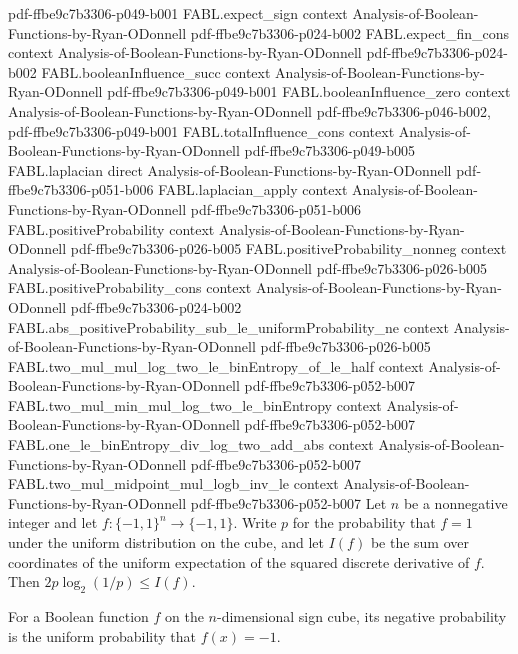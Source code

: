 \begin{theorem}
  {pdf-ffbe9c7b3306-p049-b001}
\proofstep
  {FABL.expect_sign}
  {context}
  {Analysis-of-Boolean-Functions-by-Ryan-ODonnell}
  {pdf-ffbe9c7b3306-p024-b002}
\proofstep
  {FABL.expect_fin_cons}
  {context}
  {Analysis-of-Boolean-Functions-by-Ryan-ODonnell}
  {pdf-ffbe9c7b3306-p024-b002}
\proofstep
  {FABL.booleanInfluence_succ}
  {context}
  {Analysis-of-Boolean-Functions-by-Ryan-ODonnell}
  {pdf-ffbe9c7b3306-p049-b001}
\proofstep
  {FABL.booleanInfluence_zero}
  {context}
  {Analysis-of-Boolean-Functions-by-Ryan-ODonnell}
  {pdf-ffbe9c7b3306-p046-b002,
    pdf-ffbe9c7b3306-p049-b001}
\proofstep
  {FABL.totalInfluence_cons}
  {context}
  {Analysis-of-Boolean-Functions-by-Ryan-ODonnell}
  {pdf-ffbe9c7b3306-p049-b005}
\proofstep
  {FABL.laplacian}
  {direct}
  {Analysis-of-Boolean-Functions-by-Ryan-ODonnell}
  {pdf-ffbe9c7b3306-p051-b006}
\proofstep
  {FABL.laplacian_apply}
  {context}
  {Analysis-of-Boolean-Functions-by-Ryan-ODonnell}
  {pdf-ffbe9c7b3306-p051-b006}
\proofstep
  {FABL.positiveProbability}
  {context}
  {Analysis-of-Boolean-Functions-by-Ryan-ODonnell}
  {pdf-ffbe9c7b3306-p026-b005}
\proofstep
  {FABL.positiveProbability_nonneg}
  {context}
  {Analysis-of-Boolean-Functions-by-Ryan-ODonnell}
  {pdf-ffbe9c7b3306-p026-b005}
\proofstep
  {FABL.positiveProbability_cons}
  {context}
  {Analysis-of-Boolean-Functions-by-Ryan-ODonnell}
  {pdf-ffbe9c7b3306-p024-b002}
\proofstep
  {FABL.abs_positiveProbability_sub_le_uniformProbability_ne}
  {context}
  {Analysis-of-Boolean-Functions-by-Ryan-ODonnell}
  {pdf-ffbe9c7b3306-p026-b005}
\proofstep
  {FABL.two_mul_mul_log_two_le_binEntropy_of_le_half}
  {context}
  {Analysis-of-Boolean-Functions-by-Ryan-ODonnell}
  {pdf-ffbe9c7b3306-p052-b007}
\proofstep
  {FABL.two_mul_min_mul_log_two_le_binEntropy}
  {context}
  {Analysis-of-Boolean-Functions-by-Ryan-ODonnell}
  {pdf-ffbe9c7b3306-p052-b007}
\proofstep
  {FABL.one_le_binEntropy_div_log_two_add_abs}
  {context}
  {Analysis-of-Boolean-Functions-by-Ryan-ODonnell}
  {pdf-ffbe9c7b3306-p052-b007}
\proofstep
  {FABL.two_mul_midpoint_mul_logb_inv_le}
  {context}
  {Analysis-of-Boolean-Functions-by-Ryan-ODonnell}
  {pdf-ffbe9c7b3306-p052-b007}
Let $n$ be a nonnegative integer and let $f:\{-1,1\}^n\to\{-1,1\}$. Write $p$ for the
probability that $f=1$ under the uniform distribution on the cube, and let $I(f)$ be the
sum over coordinates of the uniform expectation of the squared discrete derivative of
$f$. Then $2p\log_2(1/p)\le I(f)$.
\end{theorem}

\begin{definition}
\label{FABL.negativeProbability}
\leanok
{}
For a Boolean function $f$ on the $n$-dimensional sign cube, its negative probability is
the uniform probability that $f(x)=-1$.
\end{definition}

